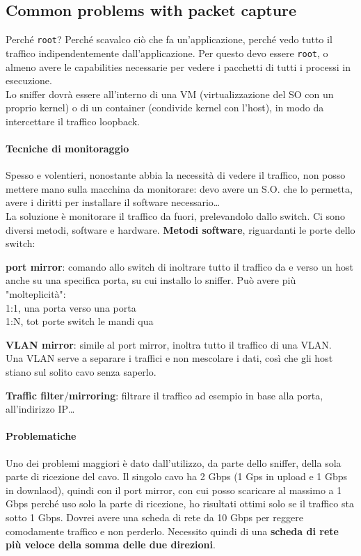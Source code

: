 \documentclass[10pt]{book}
\begin{document}
\subsection{Common problems with packet capture}
Perché \texttt{root}? Perché scavalco ciò che fa un'applicazione, perché vedo tutto il traffico indipendentemente dall'applicazione. Per questo devo essere \texttt{root}, o almeno avere le capabilities necessarie per vedere i pacchetti di tutti i processi in esecuzione.\\
Lo sniffer dovrà essere all'interno di una VM (virtualizzazione del SO con un proprio kernel) o di un container (condivide kernel con l'host), in modo da intercettare il traffico loopback.
\paragraph{Tecniche di monitoraggio}
Spesso e volentieri, nonostante abbia la necessità di vedere il traffico, non posso mettere mano sulla macchina da monitorare: devo avere un S.O. che lo permetta, avere i diritti per installare il software necessario\ldots\\
La soluzione è monitorare il traffico da fuori, prelevandolo dallo switch. Ci sono diversi metodi, software e hardware. \textbf{Metodi software}, riguardanti le porte dello switch:
\begin{list}{}{}
	\item \textbf{port mirror}: comando allo switch di inoltrare tutto il traffico da e verso un host anche su una specifica porta, su cui installo lo sniffer. Può avere più "molteplicità":\\
	1:1, una porta verso una porta\\
	1:N, tot porte switch le mandi qua
	\item \textbf{VLAN mirror}: simile al port mirror, inoltra tutto il traffico di una VLAN.\\
	Una VLAN serve a separare i traffici e non mescolare i dati, così che gli host stiano sul solito cavo senza saperlo.
\end{list}
\textbf{Traffic filter}/\textbf{mirroring}: filtrare il traffico ad esempio in base alla porta, all'indirizzo IP\ldots
\paragraph{Problematiche} Uno dei problemi maggiori è dato dall'utilizzo, da parte dello sniffer, della sola parte di ricezione del cavo. Il singolo cavo ha 2 Gbps (1 Gps in upload e 1 Gbps in downlaod), quindi con il port mirror, con cui posso scaricare al massimo a 1 Gbps perché uso solo la parte di ricezione, ho risultati ottimi solo se il traffico sta sotto 1 Gbps. Dovrei avere una scheda di rete da 10 Gbps per reggere comodamente traffico e non perderlo. Necessito quindi di una \textbf{scheda di rete più veloce della somma delle due direzioni}.
\end{document}
